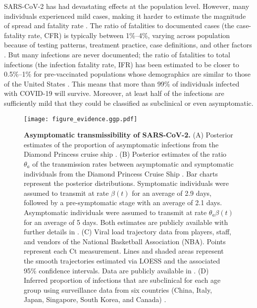\documentclass[12pt]{article}
\begin{document}
\pagebreak

SARS-CoV-2 has had devastating effects at the population level.
However, many individuals experienced mild cases, making it harder to estimate the magnitude of spread and fatality rate \citep{nogrady2020data}.
The ratio of fatalities to documented cases (the case-fatality rate, CFR) is typically between 1\%--4\%, varying across population because of testing patterns, treatment practice, case definitions, and other factors \citep{rajgor2020many,VERITY2020669,yang2020early}.
But many infections are never documented;
the ratio of fatalities to total infections (the infection fatality rate, IFR) has been estimated to be closer to 0.5\%--1\% for pre-vaccinated populations whose demographics are similar to those of the United States \citep{levin2020assessing}. 
This means that more than 99\% of individuals infected with COVID-19 will survive. 
Moreover, at least half of the infections are sufficiently mild that they could be classified as subclinical or even asymptomatic. 

\begin{figure}[!ht]
\texttt{[image: figure\_evidence.ggp.pdf]}
\caption{
\textbf{Asymptomatic transmissibility of SARS-CoV-2.}
(A) Posterior estimates of the proportion of asymptomatic infections from the Diamond Princess cruise ship \cite{emery2020}.
(B) Posterior estimates of the ratio $\theta_a$ of the transmission rates between asymptomatic and symptomatic individuals from the Diamond Princess Cruise Ship \cite{emery2020}.
Bar charts represent the posterior distributions.
Symptomatic individuals were assumed to transmit at rate $\beta(t)$ for an average of 2.9 days, followed by a pre-symptomatic stage with an average of 2.1 days. 
Asymptomatic individuals were assumed to transmit at rate $\theta_a \beta(t)$ for an average of 5 days.
Both estimates are publicly available with further details in \cite{emery2020}.
(C) Viral load trajectory data from players, staff, and vendors of the National Basketball Association (NBA).
Points represent each Ct measurement.
Lines and shaded areas represent the smooth trajectories estimated via LOESS and the associated 95\% confidence intervals.
Data are publicly available in \cite{Kissler2020}.
(D) Inferred proportion of infections that are subclinical for each age group using surveillance data from six countries (China, Italy, Japan, Singapore, South Korea, and Canada) \cite{davies2020}.
}
\label{fig:evidence}
\end{figure}
\end{document}
